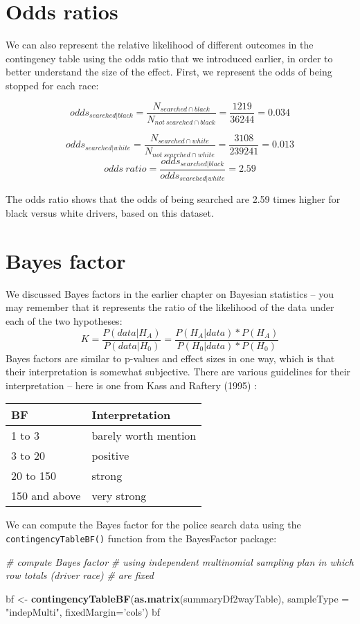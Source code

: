 \documentclass[]{book}
\newenvironment{Shaded}{\begin{snugshade}}{\end{snugshade}}
\newcommand{\KeywordTok}[1]{\textcolor[rgb]{0.13,0.29,0.53}{\textbf{#1}}}
\newcommand{\DataTypeTok}[1]{\textcolor[rgb]{0.13,0.29,0.53}{#1}}
\newcommand{\StringTok}[1]{\textcolor[rgb]{0.31,0.60,0.02}{#1}}
\newcommand{\CommentTok}[1]{\textcolor[rgb]{0.56,0.35,0.01}{\textit{#1}}}
\newcommand{\NormalTok}[1]{#1}
\theoremstyle{definition}
\theoremstyle{definition}
\theoremstyle{definition}
\theoremstyle{remark}
\begin{document}
\section{Odds ratios}\label{odds-ratios}

We can also represent the relative likelihood of different outcomes in
the contingency table using the odds ratio that we introduced earlier,
in order to better understand the size of the effect. First, we
represent the odds of being stopped for each race:

\[
odds_{searched|black} = \frac{N_{searched\cap black}}{N_{not\ searched\cap black}} = \frac{1219}{36244} = 0.034
\]

\[
odds_{searched|white} = \frac{N_{searched\cap white}}{N_{not\ searched\cap white}} = \frac{3108}{239241} = 0.013
\] \[
odds\ ratio = \frac{odds_{searched|black}}{odds_{searched|white}} = 2.59
\]

The odds ratio shows that the odds of being searched are 2.59 times
higher for black versus white drivers, based on this dataset.

\section{Bayes factor}\label{bayes-factor}

We discussed Bayes factors in the earlier chapter on Bayesian statistics
-- you may remember that it represents the ratio of the likelihood of
the data under each of the two hypotheses: \[ 
K = \frac{P(data|H_A)}{P(data|H_0)} = \frac{P(H_A|data)*P(H_A)}{P(H_0|data)*P(H_0)}
\] Bayes factors are similar to p-values and effect sizes in one way,
which is that their interpretation is somewhat subjective. There are
various guidelines for their interpretation -- here is one from Kass and
Raftery (1995) :

\begin{longtable}[]{@{}ll@{}}
\toprule
BF & Interpretation\tabularnewline
\midrule
\endhead
1 to 3 & barely worth mention\tabularnewline
3 to 20 & positive\tabularnewline
20 to 150 & strong\tabularnewline
150 and above & very strong\tabularnewline
\bottomrule
\end{longtable}

We can compute the Bayes factor for the police search data using the
\texttt{contingencyTableBF()} function from the BayesFactor package:

\begin{Shaded}
\begin{Highlighting}[]
\CommentTok{# compute Bayes factor }
\CommentTok{# using independent multinomial sampling plan in which row totals (driver race)}
\CommentTok{# are fixed}

\NormalTok{bf <-}\StringTok{ }\KeywordTok{contingencyTableBF}\NormalTok{(}\KeywordTok{as.matrix}\NormalTok{(summaryDf2wayTable), }
                         \DataTypeTok{sampleType =} \StringTok{"indepMulti"}\NormalTok{,}
                         \DataTypeTok{fixedMargin=}\StringTok{'cols'}\NormalTok{)}
\NormalTok{bf}
\end{Highlighting}
\end{Shaded}
\end{document}
